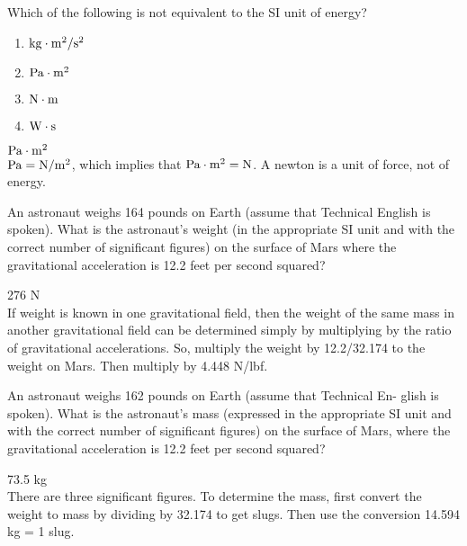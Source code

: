 
\begin{question}[subtitle=Patrick F. Dunn Sol. 2.4]
Which of the following is not equivalent to the SI unit of energy?

\begin{enumerate}
\item ${\rm kg \cdot m^2 /s^2}$
\item ${\rm Pa \cdot m^2}$
\item ${\rm N \cdot m}$
\item ${\rm W \cdot s } $
\end{enumerate}
\examspace*{5em}

\end{question}
\begin{solution}
${\rm Pa \cdot m^2}$ \\
${\rm Pa = N/m^2}$, which implies that ${\rm Pa \cdot m^2 = N}$. A newton is a unit of force, not of energy.

\end{solution}


\begin{question}[subtitle=Patrick F. Dunn Sol. 2.7]
An astronaut weighs 164 pounds on Earth (assume that Technical English is spoken). What is the astronaut’s weight (in the appropriate SI unit and
with the correct number of significant figures) on the surface of Mars where the gravitational acceleration is 12.2 feet per second squared?
\examspace*{5em}

\end{question}
\begin{solution}
276 N \\
If weight is known in one gravitational field, then the weight of the same
mass in another gravitational field can be determined simply by multiplying by the ratio of gravitational accelerations. So, multiply the weight by 12.2/32.174 to the weight on Mars. Then multiply by 4.448 N/lbf.

\end{solution}

\begin{question}[subtitle=Patrick F. Dunn Sol. 2.8]
An astronaut weighs 162 pounds on Earth (assume that Technical En-
glish is spoken). What is the astronaut’s mass (expressed in the appropriate SI unit and with the correct number of significant figures) on the surface of Mars, where the gravitational acceleration is 12.2 feet per second squared?
\examspace*{5em}

\end{question}
\begin{solution}
73.5 kg \\
There are three significant figures. To determine the mass, first convert
the weight to mass by dividing by 32.174 to get slugs. Then use the conversion 14.594 kg = 1 slug.

\end{solution}

